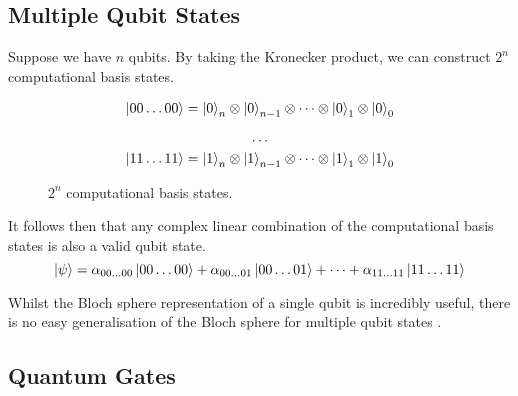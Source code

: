 \subsection{Multiple Qubit States}
Suppose we have $n$ qubits. By taking the Kronecker product, we can construct $2^n$ computational basis states.
\begin{figure}[H]
\centering
\begin{gather*}
\ket{00 \dots 00} =
\ket{0}_n \otimes \ket{0}_{n-1} \otimes \dots
\otimes \ket{0}_1 \otimes \ket{0}_0 \\[1ex]
%
\dots \\
%
\ket{11 \dots 11} =
\ket{1}_n \otimes \ket{1}_{n-1} \otimes \dots
\otimes \ket{1}_1 \otimes \ket{1}_0
\end{gather*}
\caption{$2^n$ computational basis states.}
\end{figure}

It follows then that any complex linear combination of the computational basis states is also a valid qubit state.
\begin{equation*}
\ket\psi =
\alpha_{00 \dots 00}\ket{00 \dots 00} +
\alpha_{00 \dots 01}\ket{00 \dots 01} +
\dots +
\alpha_{11 \dots 11}\ket{11 \dots 11}
\end{equation*}

Whilst the Bloch sphere representation of a single qubit is incredibly useful, there is no easy generalisation of the Bloch sphere for multiple qubit states \cite{Nielsen2012}.

\subsection{Quantum Gates}
